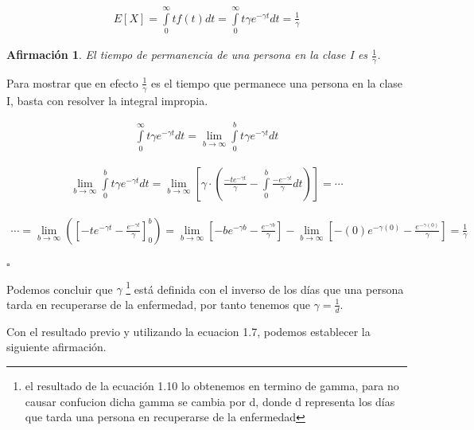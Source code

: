 \documentclass[a4paper,openany,12pt]{book}
\newtheorem{Af}{Afirmación}
\begin{document}
\begin{align}
E[X] = \int \limits_{0}^{\infty} tf(t)dt = \int \limits_{0}^{\infty} t\gamma e^{-\gamma t} dt = \frac{1}{\gamma}
\end{align}

\begin{Af}
El tiempo de permanencia de una persona en la clase I es $\frac{1}{\gamma}$. \cite{Martcheva}
\end{Af}

\begin{Dem}

Para mostrar que en efecto $\frac{1}{\gamma}$ es el tiempo que permanece una persona en la clase I, basta con resolver la integral impropia.

\begin{align*} 
\int \limits_{0}^{\infty} t\gamma e^{-\gamma t} dt = \lim\limits_{b\rightarrow \infty} \int \limits_{0}^{b} t\gamma e^{-\gamma t}dt 
\end{align*}

\begin{align*}
\lim\limits_{b\rightarrow \infty} \int \limits_{0}^{b} t\gamma e^{-\gamma t}dt = \lim\limits_{b\rightarrow \infty} \left[ \gamma \cdot \left( \frac{-t e^{-\gamma t}}{\gamma} - \int \limits_{0}^{b} \frac{-e^{-\gamma t}}{\gamma} dt \right)\right] = \cdots
\end{align*}

\begin{align*}
\cdots = \lim\limits_{b\rightarrow \infty} \left( \left[ -te^{- \gamma t} - \frac{e^{-\gamma t}}{\gamma} \right]_0^b \right) = \lim\limits_{b\rightarrow \infty} \left[ -be^{- \gamma b} - \frac{e^{- \gamma b}}{\gamma} \right] - \lim\limits_{b\rightarrow \infty} \left[ -(0)e^{- \gamma (0)} - \frac{e^{- \gamma (0)}}{\gamma} \right] = \frac{1}{\gamma}  \\
\end{align*}

\hfill	$\square$

\end{Dem}

Podemos concluir que $\gamma$ \footnote{el resultado de la ecuación 1.10 lo obtenemos en termino de gamma, para no causar confucion dicha gamma se cambia por d, donde d representa los días que tarda una persona en recuperarse de la enfermedad} está definida con el inverso de los días que una persona tarda en recuperarse de la enfermedad, por tanto tenemos que $\gamma = \frac{1}{d}$.

Con el resultado previo y utilizando la ecuacion 1.7, podemos establecer la siguiente afirmación.
\end{document}

